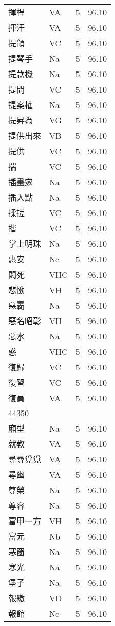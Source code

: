 \documentclass[twocolumn]{book}
\begin{document}
\begin{supertabular}{llrr}
揮桿 & VA & 5 &  96.10\\
揮汗 & VA & 5 &  96.10\\
提領 & VC & 5 &  96.10\\
提琴手 & Na & 5 &  96.10\\
提款機 & Na & 5 &  96.10\\
提問 & VC & 5 &  96.10\\
提案權 & Na & 5 &  96.10\\
提昇為 & VG & 5 &  96.10\\
提供出來 & VB & 5 &  96.10\\
提供 & VC & 5 &  96.10\\
揣 & VC & 5 &  96.10\\
插畫家 & Na & 5 &  96.10\\
插入點 & Na & 5 &  96.10\\
揉搓 & VC & 5 &  96.10\\
揩 & VC & 5 &  96.10\\
掌上明珠 & Na & 5 &  96.10\\
惠安 & Nc & 5 &  96.10\\
悶死 & VHC & 5 &  96.10\\
悲慟 & VH & 5 &  96.10\\
惡霸 & Na & 5 &  96.10\\
惡名昭彰 & VH & 5 &  96.10\\
惡水 & Na & 5 &  96.10\\
惑 & VHC & 5 &  96.10\\
復歸 & VC & 5 &  96.10\\
復習 & VC & 5 &  96.10\\
復員 & VA & 5 &  96.10\\
44350\\
廂型 & Na & 5 &  96.10\\
就教 & VA & 5 &  96.10\\
尋尋覓覓 & VA & 5 &  96.10\\
尋幽 & VA & 5 &  96.10\\
尊榮 & Na & 5 &  96.10\\
尊容 & Na & 5 &  96.10\\
富甲一方 & VH & 5 &  96.10\\
富元 & Nb & 5 &  96.10\\
寒窗 & Na & 5 &  96.10\\
寒光 & Na & 5 &  96.10\\
堡子 & Na & 5 &  96.10\\
報繳 & VD & 5 &  96.10\\
報館 & Nc & 5 &  96.10\\

\end{supertabular}
\end{document}
